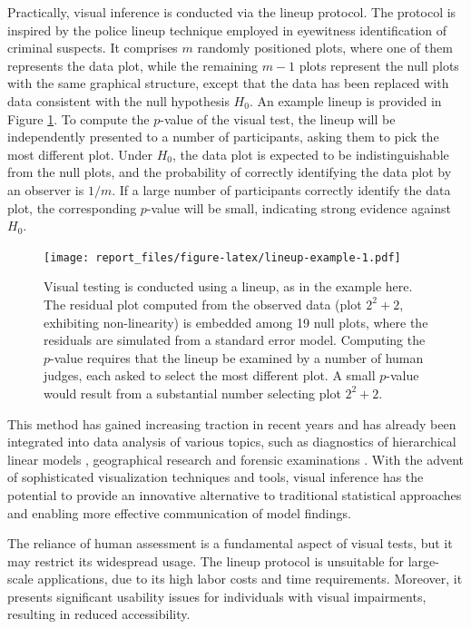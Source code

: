 \documentclass[11pt,a4paper,]{article}
\begin{document}
Practically, visual inference is conducted via the lineup protocol. The protocol is inspired by the police lineup technique employed in eyewitness identification of criminal suspects. It comprises \(m\) randomly positioned plots, where one of them represents the data plot, while the remaining \(m - 1\) plots represent the null plots with the same graphical structure, except that the data has been replaced with data consistent with the null hypothesis \(H_0\). An example lineup is provided in Figure \ref{fig:lineup-example}. To compute the \(p\)-value of the visual test, the lineup will be independently presented to a number of participants, asking them to pick the most different plot. Under \(H_0\), the data plot is expected to be indistinguishable from the null plots, and the probability of correctly identifying the data plot by an observer is \(1/m\). If a large number of participants correctly identify the data plot, the corresponding \(p\)-value will be small, indicating strong evidence against \(H_0\).

\begin{figure}
\centering
\texttt{[image: report\_files/figure-latex/lineup-example-1.pdf]}
\caption{\label{fig:lineup-example}Visual testing is conducted using a lineup, as in the example here. The residual plot computed from the observed data (plot \(2^2 + 2\), exhibiting non-linearity) is embedded among 19 null plots, where the residuals are simulated from a standard error model. Computing the \(p\)-value requires that the lineup be examined by a number of human judges, each asked to select the most different plot. A small \(p\)-value would result from a substantial number selecting plot \(2^2 + 2\).}
\end{figure}

This method has gained increasing traction in recent years and has already been integrated into data analysis of various topics, such as diagnostics of hierarchical linear models \autocite{loy2013diagnostic}, geographical research \autocite{widen_graphical_2016} and forensic examinations \autocite{krishnan_hierarchical_2021}. With the advent of sophisticated visualization techniques and tools, visual inference has the potential to provide an innovative alternative to traditional statistical approaches and enabling more effective communication of model findings.

The reliance of human assessment is a fundamental aspect of visual tests, but it may restrict its widespread usage. The lineup protocol is unsuitable for large-scale applications, due to its high labor costs and time requirements. Moreover, it presents significant usability issues for individuals with visual impairments, resulting in reduced accessibility.
\end{document}
